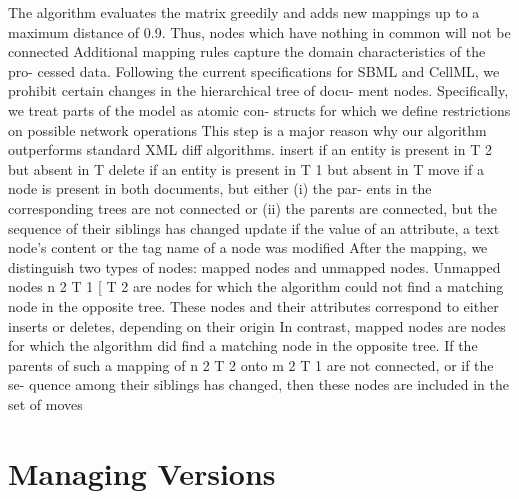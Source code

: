 \begin{itemize}
		\subitem The algorithm evaluates the matrix greedily and adds new mappings up to a maximum distance of 0.9. Thus, nodes which have nothing in common will not be connected 
		\subitem Additional mapping rules capture the domain characteristics of the pro- cessed data. Following the current specifications for SBML and CellML, we prohibit certain changes in the hierarchical tree of docu- ment nodes. Specifically, we treat parts of the model as atomic con- structs for which we define restrictions on possible network operations 
		\subitem This step is a major reason why our algorithm outperforms standard XML diff algorithms. 
		\subitem insert if an entity is present in T 2 but absent in T 
		\subitem delete if an entity is present in T 1 but absent in T 
		\subitem move if a node is present in both documents, but either (i) the par- ents in the corresponding trees are not connected or (ii) the parents are connected, but the sequence of their siblings has changed 
		\subitem update if the value of an attribute, a text node's content or the tag name of a node was modified
		\subitem After the mapping, we distinguish two types of nodes: mapped nodes and unmapped nodes. Unmapped nodes n 2 T 1 [ T 2 are nodes for which the algorithm could not find a matching node in the opposite tree. These nodes and their attributes correspond to either inserts or deletes, depending on their origin 
		\subitem In contrast, mapped nodes are nodes for which the algorithm did find a matching node in the opposite tree. If the parents of such a mapping of n 2 T 2 onto m 2 T 1 are not connected, or if the se- quence among their siblings has changed, then these nodes are included in the set of moves 
	\end{itemize}
	
\section{Managing Versions}
